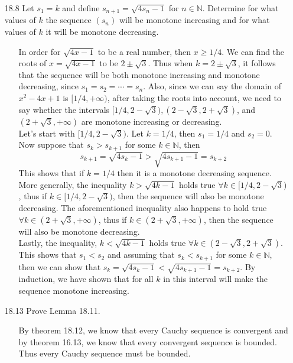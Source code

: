\documentclass[12pt]{article}
\begin{document}
\begin{enumerate}
\begin{enumerate}
\item[18.8] Let $s_1 = k$ and define $s_{n+1} = \sqrt{4s_n - 1}$ for $n \in \mathbb{N}$. Determine for what values of $k$ the sequence $(s_n)$ will be monotone increasing and for what values of $k$ it will be monotone decreasing.
\begin{enumerate}
\item[] In order for $\sqrt{4x - 1}$ to be a real number, then $x \geq 1/4$. We can find
the roots of $x = \sqrt{4x - 1}$ to be $2 \pm \sqrt{3}$. Thus when $k = 2 \pm \sqrt{3}$, it
follows that the sequence will be both monotone increasing and monotone decreasing, since
$s_1 = s_2 = \cdots = s_n$. Also, since we can say the domain of $x^2 - 4x + 1$ is
$[1/4, +\infty)$, after taking the roots into account, we need to 
say whether the intervals $[1/4, 2 - \sqrt{3}), (2 - \sqrt{3}, 2 + \sqrt{3})$, and 
$(2 + \sqrt{3}, +\infty)$ are monotone increasing or decreasing. \\
Let's start with $[1/4, 2 - \sqrt{3})$. Let $k = 1/4$, then $s_1 = 1/4$ and 
$s_2 = 0$. Now suppose that $s_k > s_{k + 1}$ for some $k \in \mathbb{N}$, then
\[
s_{k + 1} = \sqrt{4s_k - 1} > \sqrt{4s_{k+1} - 1} = s_{k + 2}
\]
This shows that if $k = 1/4$ then it is a monotone decreasing sequence.
More generally, the inequality $k > \sqrt{4k - 1}$ holds true $\forall k \in [1/4, 2 - \sqrt{3})$,
thus if $k \in [1/4, 2 - \sqrt{3})$, then the sequence will also be monotone decreasing. The 
aforementioned inequality also happens to hold true $\forall k \in (2 + \sqrt{3}, +\infty)$, 
thus if $k \in (2 + \sqrt{3}, +\infty)$, then the sequence will also be monotone decreasing.\\
Lastly, the inequality, $k < \sqrt{4k - 1}$ holds true $\forall k \in (2 - \sqrt{3}, 2 + \sqrt{3})$.
This shows that $s_1 < s_2$ and assuming that $s_k < s_{k + 1}$ for some $k \in \mathbb{N}$, then
we can show that $s_k = \sqrt{4s_k - 1} < \sqrt{4s_{k+1} - 1} = s_{k + 2}$. By induction,
we have shown that for all $k$ in this interval will make the sequence monotone increasing.
\end{enumerate}

\item[18.13] Prove Lemma 18.11.
\begin{enumerate}
\item[] By theorem 18.12, we know that every Cauchy sequence is convergent and by theorem 16.13, 
we know that every convergent sequence is bounded. Thus every Cauchy sequence must be bounded.
\end{enumerate}


\end{enumerate}
\end{enumerate}
\end{document}
